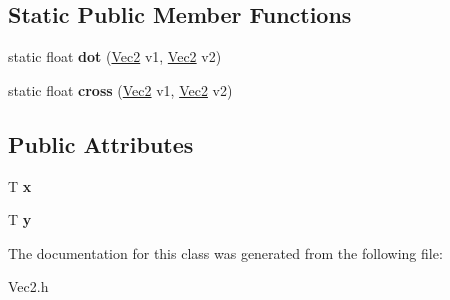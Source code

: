 \subsection*{Static Public Member Functions}
\begin{DoxyCompactItemize}
\item 
\mbox{\label{classVec2_a9330ef5ea7ace973ffc6729b31706cbd}} 
static float {\bfseries dot} (\mbox{\hyperlink{classVec2}{Vec2}} v1, \mbox{\hyperlink{classVec2}{Vec2}} v2)
\item 
\mbox{\label{classVec2_a2e1237d182344d8bc390e9ea9881e4fa}} 
static float {\bfseries cross} (\mbox{\hyperlink{classVec2}{Vec2}} v1, \mbox{\hyperlink{classVec2}{Vec2}} v2)
\end{DoxyCompactItemize}
\subsection*{Public Attributes}
\begin{DoxyCompactItemize}
\item 
\mbox{\label{classVec2_a8ef8f719932c920ac4ce11399c983d53}} 
T {\bfseries x}
\item 
\mbox{\label{classVec2_a7ea262a941af6b3abd284ab97658806c}} 
T {\bfseries y}
\end{DoxyCompactItemize}


The documentation for this class was generated from the following file\+:\begin{DoxyCompactItemize}
\item 
Vec2.\+h\end{DoxyCompactItemize}
